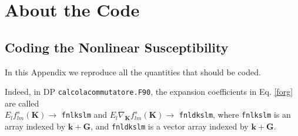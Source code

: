 \chapter{About the Code}\label{app:code}
\partialtoc



\section{Coding the Nonlinear Susceptibility}\label{code}

In this Appendix we reproduce all the quantities  that should be coded.

{\color{red} 
Indeed, in DP \verb=calcolacommutatore.F90=, the expansion coefficients in Eq.
\eqref{forg} are called\\ $E_lf_{lm}^s (\mathbf{K})\to$
\verb=fnlkslm= and $E_l\nabla_\mathbf{K} f_{lm}^s(\mathbf{K})\to$
\verb=fnldkslm=, where \verb=fnlkslm= is an array indexed by
$\mathbf{k}+\mathbf{G}$, and \verb=fnldkslm= is a vector array indexed by
$\mathbf{k}+\mathbf{G}$.}

